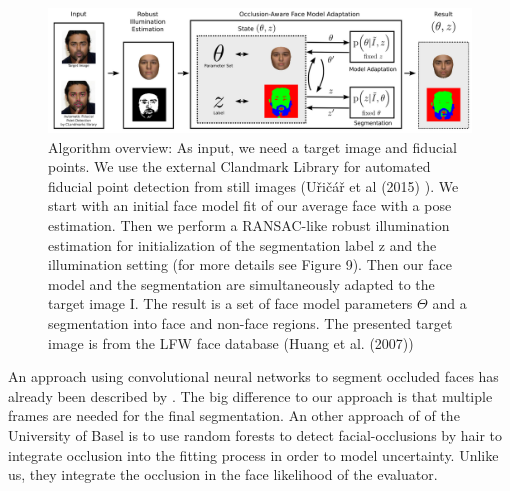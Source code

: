 \begin{figure}
	\centering
	\includegraphics[width=1\linewidth]{Figures/chap1/EGGER's_method.png}
	\caption[caption without footnote, for lof]{\footnotemark Algorithm overview: As input, we need a target image and fiducial points. We use the external Clandmark Library for automated fiducial point detection from still images (U\v ri\v c\' a\v r et al (2015) \cite{Uricar}). We start with an initial face model fit of our average face with a pose estimation. Then we perform a RANSAC-like robust illumination estimation for initialization of the segmentation label z and the illumination setting (for more details see Figure 9). Then our face model and the segmentation are simultaneously adapted to the target image I. The result is a set of face model parameters $\Theta$ and a segmentation into face and non-face regions. The presented target image is from the LFW face database (Huang et al. (2007))}
	\label{fig:EGGER's_method}
\end{figure}


An approach using convolutional neural networks to segment occluded faces has already been described by \cite{SaitoEtAl}. The big difference to our approach is that multiple frames are needed for the final segmentation. An other approach of \cite{MorelForster} of the University of Basel is to use random forests to detect facial-occlusions by hair to integrate occlusion into the fitting process in order to model uncertainty. Unlike us, they integrate the occlusion in the face likelihood of the evaluator.

